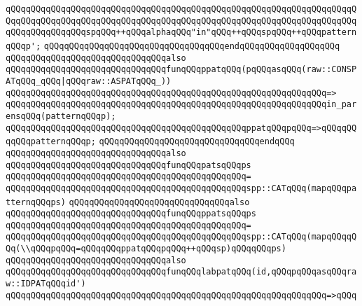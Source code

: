 \verb|qQQqqQQqqQQqqQQqqQQqqQQqqQQqqQQqqQQqqQQqqQQqqQQqqQQqqQQqqQQqqQQqqQQqqQQqqQQqqQQqqQQqqQQqqQQqqQQqqQQqqQQqqQQqqQQqqQQqqQQqqQQqqQQqqQQqqQQqqQQqqQQqqQQqqQQqqQQqspqQQq++qQQqalphaqQQq"in"qQQq++qQQqspqQQq++qQQqpatternqQQqp';|\newline
\verb|qQQqqQQqqQQqqQQqqQQqqQQqqQQqqQQqqQQqendqQQqqQQqqQQqqQQqqQQq|\newline
\newline
\verb|qQQqqQQqqQQqqQQqqQQqqQQqqQQqqQQqalso|\newline
\verb|qQQqqQQqqQQqqQQqqQQqqQQqqQQqqQQqfunqQQqppatqQQq(pqQQqasqQQq(raw::CONSPATqQQq_qQQq|\verb#|qQQqraw::ASPATqQQq_))#\newline
\verb|qQQqqQQqqQQqqQQqqQQqqQQqqQQqqQQqqQQqqQQqqQQqqQQqqQQqqQQqqQQqqQQq=>|\newline
\verb|qQQqqQQqqQQqqQQqqQQqqQQqqQQqqQQqqQQqqQQqqQQqqQQqqQQqqQQqqQQqqQQqin_parensqQQq(patternqQQqp);|\newline
\newline
\verb|qQQqqQQqqQQqqQQqqQQqqQQqqQQqqQQqqQQqqQQqqQQqqQQqppatqQQqpqQQq=>qQQqqQQqqQQqpatternqQQqp;|\newline
\verb|qQQqqQQqqQQqqQQqqQQqqQQqqQQqqQQqendqQQq|\newline
\newline
\verb|qQQqqQQqqQQqqQQqqQQqqQQqqQQqqQQqalso|\newline
\verb|qQQqqQQqqQQqqQQqqQQqqQQqqQQqqQQqfunqQQqpatsqQQqps|\newline
\verb|qQQqqQQqqQQqqQQqqQQqqQQqqQQqqQQqqQQqqQQqqQQqqQQq=|\newline
\verb|qQQqqQQqqQQqqQQqqQQqqQQqqQQqqQQqqQQqqQQqqQQqqQQqspp::CATqQQq(mapqQQqpatternqQQqps)|\newline
\newline
\verb|qQQqqQQqqQQqqQQqqQQqqQQqqQQqqQQqalso|\newline
\verb|qQQqqQQqqQQqqQQqqQQqqQQqqQQqqQQqfunqQQqppatsqQQqps|\newline
\verb|qQQqqQQqqQQqqQQqqQQqqQQqqQQqqQQqqQQqqQQqqQQqqQQq=|\newline
\verb|qQQqqQQqqQQqqQQqqQQqqQQqqQQqqQQqqQQqqQQqqQQqqQQqspp::CATqQQq(mapqQQqqQQq(\\qQQqpqQQq=qQQqqQQqppatqQQqpqQQq++qQQqsp)qQQqqQQqps)|\newline
\newline
\verb|qQQqqQQqqQQqqQQqqQQqqQQqqQQqqQQqalso|\newline
\verb|qQQqqQQqqQQqqQQqqQQqqQQqqQQqqQQqfunqQQqlabpatqQQq(id,qQQqpqQQqasqQQqraw::IDPATqQQqid')|\newline
\verb|qQQqqQQqqQQqqQQqqQQqqQQqqQQqqQQqqQQqqQQqqQQqqQQqqQQqqQQqqQQqqQQq=>qQQq|\newline
